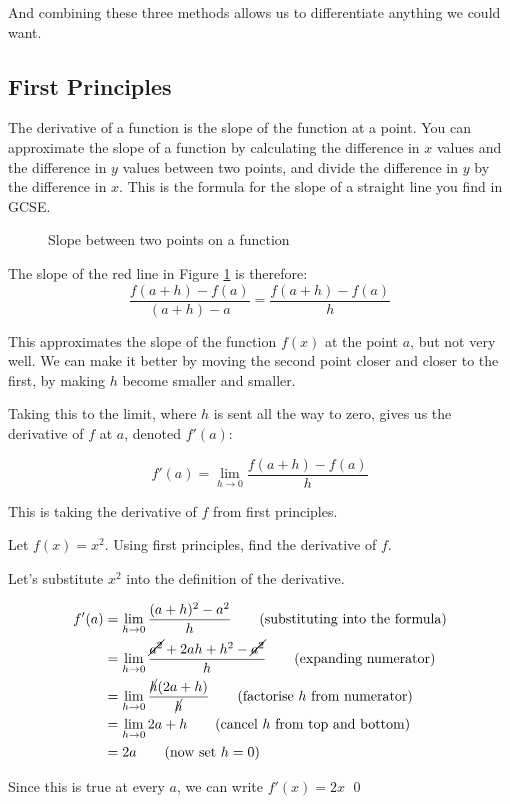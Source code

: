 And combining these three methods allows us to differentiate anything we could want.

\subsection{First Principles} \label{sec:first-principles}
The derivative of a function is the slope of the function at a point. You can approximate the slope of a function by 
calculating the difference in $x$ values and the difference in $y$ values between two points, and divide the difference in $y$ 
by the difference in $x$. This is the formula for the slope of a straight line you find in GCSE.

\begin{figure}[H]
    \centering
    \caption{Slope between two points on a function}
    \label{fig:derivative-first-princ}
\end{figure}

The slope of the red line in Figure \ref{fig:derivative-first-princ} is therefore:
\[ \frac{f(a+h) - f(a)}{(a+ h) - a} = \frac{f(a+h) - f(a)}{h}\]

This approximates the slope of the function $f(x)$ at the point $a$, but not very well. We can make it better by 
moving the second point closer and closer to the first, by making $h$ become smaller and smaller.

Taking this to the limit, where $h$ is sent all the way to zero, gives us the derivative of $f$ at $a$, denoted $f'(a)$:

\[ f'(a) = \lim_{h \rightarrow 0} \frac{f(a+h) - f(a)}{h} \]

This is taking the derivative of $f$ from first principles.

\begin{example}
    Let $f(x) = x^2$. Using first principles, find the derivative of $f$.
\end{example}
\begin{solution}
    Let's substitute $x^2$ into the definition of the derivative.

    \begin{align*}
        f'(a) &= \lim_{h \rightarrow 0} \frac{(a+h)^2 - a^2}{h} \tag{substituting into the formula}\\
         &= \lim_{h \rightarrow 0} \frac{\cancel{a^2} + 2ah + h^2 - \cancel{a^2}}{h}  \tag{expanding numerator} \\
         &= \lim_{h \rightarrow 0} \frac{\cancel{h}(2a + h)}{\cancel{h}}  \tag{factorise $h$ from numerator} \\
         &= \lim_{h \rightarrow 0} 2a + h  \tag{cancel $h$ from top and bottom} \\ 
        &= 2a \tag{now set $h=0$}
    \end{align*}

    Since this is true at every $a$, we can write 
    $f'(x) = 2x$
    \qed
\end{solution}

